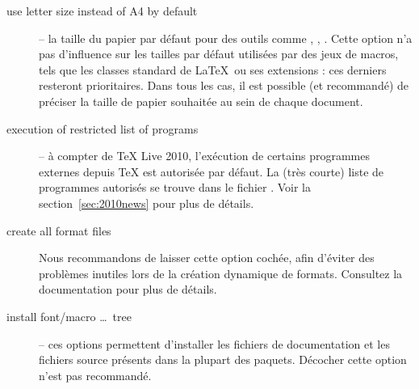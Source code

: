 \documentclass[german, english, french, 12pt]{article}
\renewcommand{\TL}{\TeX{} Live\xspace}%
\begin{document}
\begin{description}
\item[use letter size instead of A4 by default] -- la taille du papier par
  défaut pour des outils comme , , .  Cette
  option n'a pas d'influence sur les tailles par défaut utilisées par des jeux
  de macros, tels que les classes standard de \LaTeX\ ou ses extensions : ces
  derniers resteront prioritaires. Dans tous les cas, il est possible (et
  recommandé) de préciser la taille de papier souhaitée au sein de chaque
  document.

\item[execution of restricted list of programs] -- à compter de \TL 2010,
  l'exécution de certains programmes externes depuis \TeX{} est autorisée par
  défaut. La (très courte) liste de programmes autorisés se trouve dans le
  fichier . Voir la section~\ref{sec:2010news} pour plus de
  détails.

\item [create all format files] Nous recommandons de laisser cette option
  cochée, afin d'éviter des problèmes inutiles lors de la création dynamique de
  formats.  Consultez la documentation  pour plus de détails.


\item[install font/macro \ldots\ tree] -- ces options permettent d'installer les
  fichiers de documentation et les fichiers source présents dans la plupart des
  paquets. Décocher cette option n'est pas recommandé.


\end{description}
\end{document}

